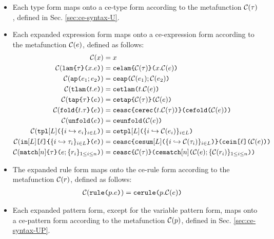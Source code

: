 \begin{itemize}
  \item Each type form maps onto a ce-type form according to the metafunction $\Cof{\tau}$, defined in Sec. \ref{sec:ce-syntax-U}.
  \item Each expanded expression form maps onto a ce-expression form according to the metafunction $\Cof{e}$, defined as follows:
  \begin{align*}
\Cof{x} & = {x}\\
\Cof{\aelam{\tau}{x}{e}} & = \acelam{\Cof{\tau}}{{x}}{\Cof{e}}\\
\Cof{\aeap{e_1}{e_2}} & = \aceap{\Cof{e_1}}{\Cof{e_2}}\\
\Cof{\aetlam{t}{e}} & = \acetlam{{t}}{\Cof{e}}\\
\Cof{\aetap{e}{\tau}} & = \acetap{\Cof{e}}{\Cof{\tau}}\\
\Cof{\aefold{t}{\tau}{e}} & = \aceasc{\acerec{{t}}{\Cof{\tau}}}{\aceanafold{\Cof e}}\\
\Cof{\aeunfold{e}} & = \aceunfold{\Cof{e}}\\
\Cof{\aetpl{\labelset}{\mapschema{e}{i}{\labelset}}} & = \acetpl{\labelset}{\mapschemax{\Cofv}{e}{i}{\labelset}}\\
\Cof{\aein{\labelset}{\ell}{\mapschema{\tau}{i}{\labelset}}{e}} &= \aceasc{\acesum{\labelset}{\mapschemax{\Cofv}{\tau}{i}{\labelset}}}{\aceanain{\ell}{\Cof{e}}}\\
\Cof{\aematchwith{n}{\tau}{e}{\seqschemaX{r}}} &= \aceasc{{\Cof{\tau}}}{\acematchwithb{n}{\Cof{e}}{\seqschemaXx{\Cofv}{r}}}\\
\end{align*}
  \item The expanded rule form maps onto the ce-rule form according to the metafunction $\Cof{r}$, defined as follows:
  \begin{align*}
  \Cof{\aematchrule{p}{e}} & = \acematchrule{p}{\Cof{e}}
  \end{align*}
  \item Each expanded pattern form, except for the variable pattern form, maps onto a ce-pattern form according to the metafunction $\Cof{p}$, defined in Sec. \ref{sec:ce-syntax-UP}.
\end{itemize}

